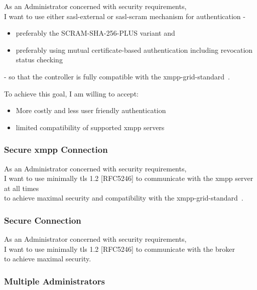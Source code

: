 As an Administrator concerned with security requirements,\\
I want to use either \gls{sasl-external} or \gls{sasl-scram} mechanism for authentication -

\begin{itemize}
    \item preferably the SCRAM-SHA-256-PLUS variant and
    \item preferably using mutual certificate-based authentication including revocation status checking
\end{itemize}

\noindent - so that the controller is fully compatible with the \gls{xmpp-grid-standard}~\cite{ietf-mile-xmpp-grid-05}.

\noindent To achieve this goal, I am willing to accept:
\begin{itemize}
    \item More costly and less user friendly authentication
    \item limited compatibility of supported \gls{xmpp} servers
\end{itemize}

\subsubsection{Secure \gls{xmpp} Connection}

As an Administrator concerned with security requirements,\\
I want to use minimally \gls{tls} 1.2 [RFC5246] to communicate with the \gls{xmpp} server at all times\\
to achieve maximal security and compatibility with the \gls{xmpp-grid-standard}~\cite{ietf-mile-xmpp-grid-05}.

\subsubsection{Secure Connection}

As an Administrator concerned with security requirements,\\
I want to use minimally \gls{tls} 1.2 [RFC5246] to communicate with the \gls{broker}\\
to achieve maximal security.

\subsubsection{Multiple Administrators}\label{sec:requirement-multiple-administrators}

